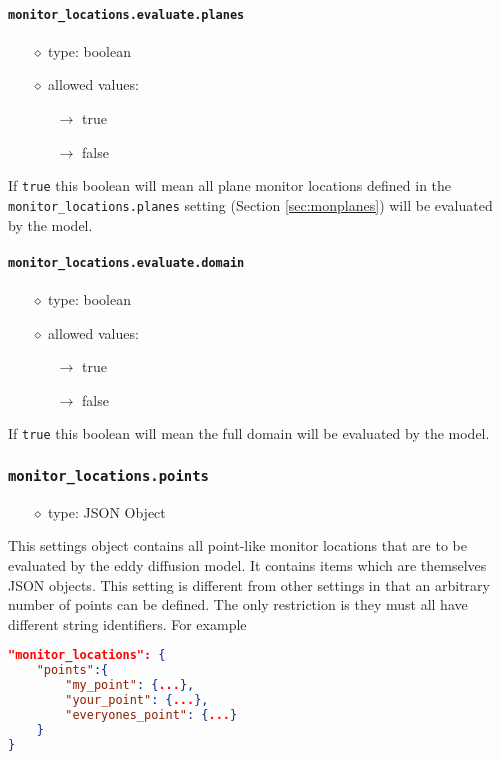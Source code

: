 \documentclass[]{article}
\def\code#1{\texttt{#1}}
\begin{document}
\paragraph{\code{monitor\_locations.evaluate.planes}}
\begin{itemize}
    \item[$\diamond$] type: boolean
    \item[$\diamond$] allowed values:
    \begin{itemize}
        \item[$\rightarrow$] true
        \item[$\rightarrow$] false
    \end{itemize}
\end{itemize}
If \code{true} this boolean will mean all plane monitor locations defined in the
\code{monitor\_locations.planes} setting (Section \ref{sec:monplanes}) will be
evaluated by the model.

\paragraph{\code{monitor\_locations.evaluate.domain}}
\begin{itemize}
    \item[$\diamond$] type: boolean
    \item[$\diamond$] allowed values:
    \begin{itemize}
        \item[$\rightarrow$] true
        \item[$\rightarrow$] false
    \end{itemize}
\end{itemize}
If \code{true} this boolean will mean the full domain  will be evaluated by the
model. 


\subsubsection{\code{monitor\_locations.points}}\label{sec:monpoints}
\begin{itemize}
    \item[$\diamond$] type: JSON Object 
\end{itemize}
This settings object contains all point-like monitor locations that are to be
evaluated by the eddy diffusion model. It contains items which
are themselves JSON objects. This setting is different from other settings in
that an arbitrary number of points can be defined. The only restriction is they
must all have different string identifiers. For example\\
\begin{lstlisting}[language=json,firstnumber=1]
"monitor_locations": {
    "points":{
        "my_point": {...},
        "your_point": {...},
        "everyones_point": {...}
    }
}
\end{lstlisting}
\medskip
\end{document}
